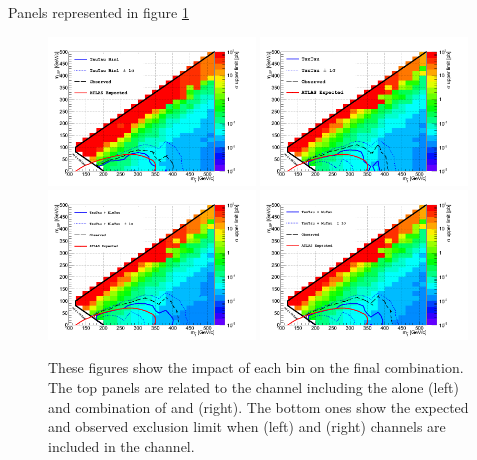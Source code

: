 Panels represented in figure \ref{fig:limit_bins}
\begin{linenomath}
\begin{figure}[h]
\centering
\includegraphics[width=0.49\textwidth,keepaspectratio=true]{StatisticsFig/Exclusion_TauTauBin1.png}
\includegraphics[width=0.49\textwidth,keepaspectratio=true]{StatisticsFig/Exclusion_TauTauBin1_Bin2.png}
\includegraphics[width=0.49\textwidth,keepaspectratio=true]{StatisticsFig/Exclusion4Bins_MuTauExcl.png}
\includegraphics[width=0.49\textwidth,keepaspectratio=true]{StatisticsFig/Exclusion4Bins_EleTauExcl.png}
\caption{These figures show the impact of each bin on the final combination. 
The top panels are related to the \tauTau channel including the \binone alone (left) and combination of \binone and \bintwo (right).
The bottom ones show the expected and observed exclusion limit when \eTau (left) and \muTau (right) channels are included in the \tauTau channel.
}
\label{fig:limit_bins}
\end{figure}
\end{linenomath}
